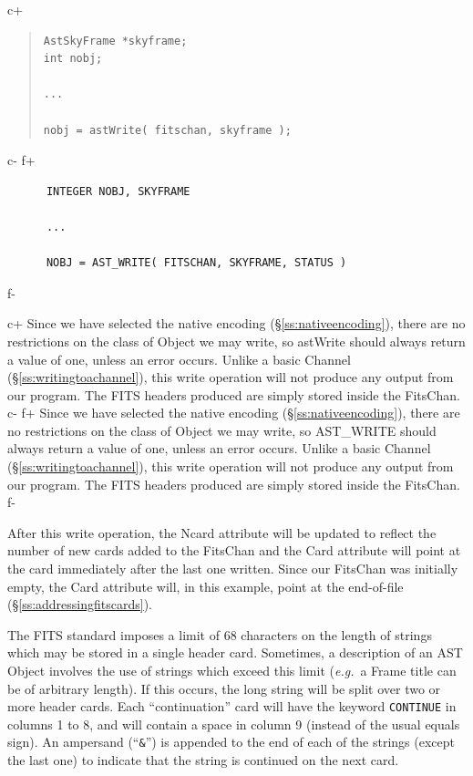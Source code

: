\documentclass[twoside,11pt]{article}
\newcommand{\secref}[1]{\S\ref{#1}}
\newcommand{\secref}[1]{\ref{#1}}
\begin{document}
c+
\begin{quote}
\small
\begin{verbatim}
AstSkyFrame *skyframe;
int nobj;

...

nobj = astWrite( fitschan, skyframe );
\end{verbatim}
\normalsize
\end{quote}
c-
f+
\small
\begin{verbatim}
      INTEGER NOBJ, SKYFRAME

      ...

      NOBJ = AST_WRITE( FITSCHAN, SKYFRAME, STATUS )
\end{verbatim}
\normalsize
f-

c+
Since we have selected the native encoding
(\secref{ss:nativeencoding}), there are no restrictions on the class
of Object we may write, so astWrite should always return a value of
one, unless an error occurs. Unlike a basic Channel
(\secref{ss:writingtoachannel}), this write operation will not produce
any output from our program. The FITS headers produced are simply
stored inside the FitsChan.
c-
f+
Since we have selected the native encoding
(\secref{ss:nativeencoding}), there are no restrictions on the class
of Object we may write, so AST\_WRITE should always return a value of
one, unless an error occurs. Unlike a basic Channel
(\secref{ss:writingtoachannel}), this write operation will not produce
any output from our program. The FITS headers produced are simply
stored inside the FitsChan.
f-

After this write operation, the Ncard attribute will be updated to
reflect the number of new cards added to the FitsChan and the Card
attribute will point at the card immediately after the last one
written. Since our FitsChan was initially empty, the Card attribute
will, in this example, point at the end-of-file
(\secref{ss:addressingfitscards}).

The FITS standard imposes a limit of 68 characters on the length of
strings which may be stored in a single header card. Sometimes, a
description of an AST Object involves the use of strings which exceed
this limit ({\em{e.g.}}\ a Frame title can be of arbitrary length). If
this occurs, the long string will be split over two or more header cards.
Each ``continuation'' card will have the keyword {\tt CONTINUE} in
columns 1 to 8, and will contain a space in column 9 (instead of the
usual equals sign). An ampersand (``{\tt \&}'') is appended to the end of
each of the strings (except the last one) to indicate that the string is
continued on the next card. 
\end{document}
